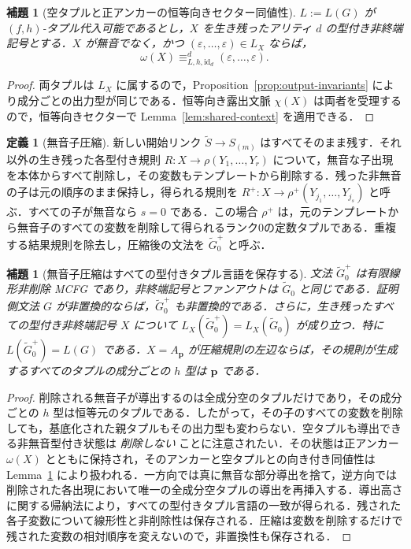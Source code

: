 \documentclass[11pt,a4paper]{ltjsarticle}
\numberwithin{equation}{section}
\theoremstyle{plain}
\newtheorem{lemma}[theorem]{補題}
\theoremstyle{definition}
\newtheorem{definition}[theorem]{定義}
\theoremstyle{remark}
\newcommand{\eps}{\varepsilon}
\begin{document}
\begin{lemma}[空タプルと正アンカーの恒等向きセクター同値性]
\label{lem:mixed-empty-positive}
\(L:=L(G)\) が \((f,h)\)-タプル代入可能であるとし，\(X\) を生き残ったアリティ \(d\) の型付き非終端記号とする．\(X\) が無音でなく，かつ \((\eps,\ldots,\eps)\in L_X\) ならば，
\[
  \omega(X)\equiv_{L,h,\mathrm{id}_d}^d(\eps,\ldots,\eps).
\]
\end{lemma}

\begin{proof}
両タプルは \(L_X\) に属するので，Proposition~\ref{prop:output-invariants} により成分ごとの出力型が同じである．恒等向き露出文脈 \(\chi(X)\) は両者を受理するので，恒等向きセクターで Lemma~\ref{lem:shared-context} を適用できる．
\end{proof}

\begin{definition}[無音子圧縮]
\label{def:silent-compression}
新しい開始リンク \(\widetilde S\to S_{(m)}\) はすべてそのまま残す．それ以外の生き残った各型付き規則
\(R:X\to\rho(Y_1,\ldots,Y_r)\)
について，無音な子出現を本体からすべて削除し，その変数もテンプレートから削除する．残った非無音の子は元の順序のまま保持し，得られる規則を
\(R^+:X\to\rho^+(Y_{j_1},\ldots,Y_{j_s})\)
と呼ぶ．すべての子が無音なら \(s=0\) である．この場合 \(\rho^+\) は，元のテンプレートから無音子のすべての変数を削除して得られるランク0の定数タプルである．重複する結果規則を除去し，圧縮後の文法を \(\widetilde G_0^+\) と呼ぶ．
\end{definition}

\begin{lemma}[無音子圧縮はすべての型付きタプル言語を保存する]
\label{lem:silent-compression}
文法 \(\widetilde G_0^+\) は有限線形非削除 MCFG であり，非終端記号とファンアウトは \(\widetilde G_0\) と同じである．証明側文法 \(G\) が非置換的ならば，\(\widetilde G_0^+\) も非置換的である．さらに，生き残ったすべての型付き非終端記号 \(X\) について
\(L_X(\widetilde G_0^+)=L_X(\widetilde G_0)\)
が成り立つ．特に \(L(\widetilde G_0^+)=L(G)\) である．\(X=A_{\mathbf p}\) が圧縮規則の左辺ならば，その規則が生成するすべてのタプルの成分ごとの \(h\) 型は \(\mathbf p\) である．
\end{lemma}

\begin{proof}
削除される無音子が導出するのは全成分空のタプルだけであり，その成分ごとの \(h\) 型は恒等元のタプルである．したがって，その子のすべての変数を削除しても，基底化された親タプルもその出力型も変わらない．空タプルも導出できる非無音型付き状態は \emph{削除しない} ことに注意されたい．その状態は正アンカー \(\omega(X)\) とともに保持され，そのアンカーと空タプルとの向き付き同値性は Lemma~\ref{lem:mixed-empty-positive} により扱われる．一方向では真に無音な部分導出を捨て，逆方向では削除された各出現において唯一の全成分空タプルの導出を再挿入する．導出高さに関する帰納法により，すべての型付きタプル言語の一致が得られる．残された各子変数について線形性と非削除性は保存される．圧縮は変数を削除するだけで残された変数の相対順序を変えないので，非置換性も保存される．
\end{proof}
\end{document}
